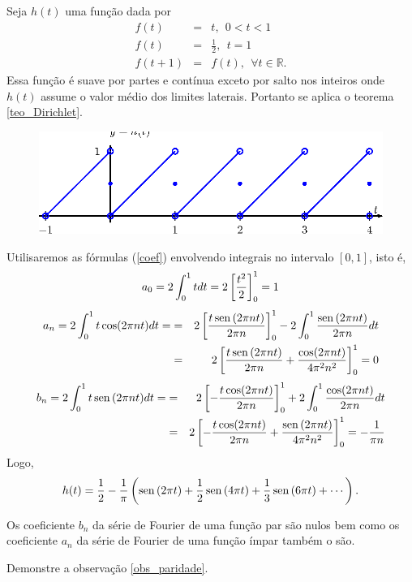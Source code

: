 \begin{ex} Seja $h(t)$ uma função dada por
\begin{eqnarray*}
f(t)&=&t, \ \ 0<t<1\\
f(t)&=&\frac{1}{2}, \ \ t=1\\
f(t+1)&=&f(t),\ \ \forall t\in\mathbb{R}.
\end{eqnarray*}
Essa função é suave por partes e contínua exceto por salto nos inteiros onde $h(t)$ assume o valor médio dos limites laterais. Portanto se aplica o teorema \ref{teo_Dirichlet}.
\begin{figure}[!ht]
\begin{center}

\includegraphics{cap_series/pics/figura_5}\end{center}
\end{figure}
Utilisaremos as fórmulas (\ref{coef}) envolvendo integrais no intervalo $[0,1]$, isto é,
  \begin{equation*}
   a_0= 2\int_{0}^{1} t dt=2\left[\frac{t^2}{2}\right]_0^1=1\\
	\end{equation*}
	\begin{eqnarray*}
   a_n=  2\int_{0}^{1} t\cos(2 \pi n t)dt=&=&2\left[\frac{t\operatorname{sen}\,(2 \pi n t)}{2 \pi n}\right]_0^1-2\int_0^1\frac{\operatorname{sen}\,(2 \pi n t)}{2 \pi n}dt\\
	&=&2\left[\frac{t\operatorname{sen}\,(2 \pi n t)}{2 \pi n}+\frac{\cos(2 \pi n t)}{4\pi^2 n^2}\right]_0^1=0\\
	 \end{eqnarray*}
	\begin{eqnarray*}
   b_n=  2\int_{0}^{1} t\operatorname{sen}\,(2 \pi n t)dt=&=&2\left[-\frac{t\cos(2 \pi n t)}{2 \pi n}\right]_0^1+2\int_0^1\frac{\cos(2 \pi n t)}{2 \pi n}dt\\
	&=&2\left[-\frac{t\cos(2 \pi n t)}{2 \pi n}+\frac{\operatorname{sen}\,(2 \pi n t)}{4\pi^2 n^2}\right]_0^1=-\frac{1}{\pi n}\\
	 \end{eqnarray*}
Logo,
\begin{equation}
h(t)=\frac{1}{2}-\frac{1}{\pi}\left(\operatorname{sen}\,(2 \pi t)+\frac{1}{2}\operatorname{sen}\,(4\pi t)+\frac{1}{3}\operatorname{sen}\,(6\pi t)+\cdots\right).
\end{equation}
\end{ex}
\begin{obs}{\label{obs_paridade}} Os coeficiente $b_n$ da série de Fourier de uma função par são nulos bem como os coeficiente $a_n$ da série de Fourier de uma função ímpar também o são.
\end{obs}
\begin{ex}Demonstre a observação \ref{obs_paridade}.
\end{ex}
